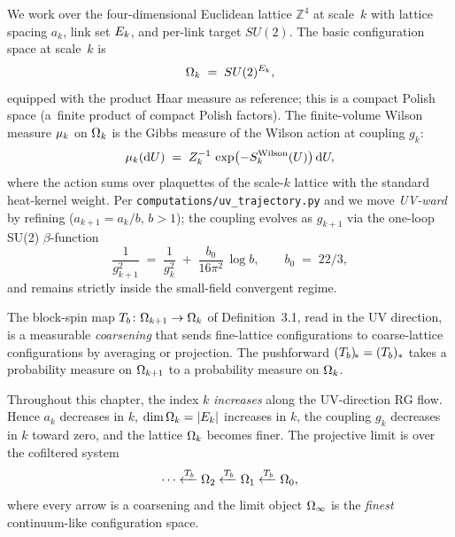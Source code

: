 We work over the four-dimensional Euclidean lattice $\mathbb{Z}^4$ at
scale~$k$ with lattice spacing $a_k$, link set $E_k$, and per-link
target $SU(2)$.  The basic configuration space at scale~$k$ is
\begin{equation*}
  \Omega_k \;=\; SU(2)^{E_k},
\end{equation*}
equipped with the product Haar measure as reference; this is a compact
Polish space (a~finite product of compact Polish factors).  The
finite-volume Wilson measure $\mu_k$ on $\Omega_k$ is the Gibbs measure of
the Wilson action at coupling $g_k$:
\begin{equation*}
  \mu_k(\mathrm{d}U) \;=\; Z_k^{-1} \, \exp\bigl(- S_k^{\mathrm{Wilson}}(U)\bigr) \, \mathrm{d}U,
\end{equation*}
where the action sums over plaquettes of the scale-$k$ lattice with
the standard heat-kernel weight.  Per
\texttt{computations/uv\_trajectory.py} and
 we move \emph{UV-ward} by
refining ($a_{k+1} = a_k / b$, $b > 1$); the coupling evolves as
$g_{k+1}$ via the one-loop SU(2) $\beta$-function
\begin{equation*}
  \frac{1}{g_{k+1}^2}  \;=\;  \frac{1}{g_k^2} \;+\; \frac{b_0}{16\pi^2} \, \log b,
  \qquad
  b_0 \;=\; 22/3,
\end{equation*}
and remains strictly inside the small-field convergent regime.

The block-spin map $T_b \colon \Omega_{k+1} \to \Omega_k$ of
 Definition~3.1, read in the
UV direction, is a measurable \emph{coarsening} that sends fine-lattice
configurations to coarse-lattice configurations by averaging or
projection.  The pushforward $(T_b)_{\!*} = (T_b)_*$ takes a probability
measure on $\Omega_{k+1}$ to a probability measure on $\Omega_k$.

\begin{convention}[UV indexing]
\label{conv:uv}
Throughout this chapter, the index $k$ \emph{increases} along the
UV-direction RG flow.  Hence $a_k$ decreases in $k$,
$\dim \Omega_k = |E_k|$ increases in $k$, the coupling $g_k$ decreases in $k$
toward zero, and the lattice $\Omega_k$ becomes finer.  The projective
limit is over the cofiltered system
\begin{equation*}
  \cdots \xleftarrow{T_b} \Omega_2 \xleftarrow{T_b} \Omega_1 \xleftarrow{T_b} \Omega_0,
\end{equation*}
where every arrow is a coarsening and the limit object $\Omega_\infty$ is the
\emph{finest} continuum-like configuration space.
\end{convention}

